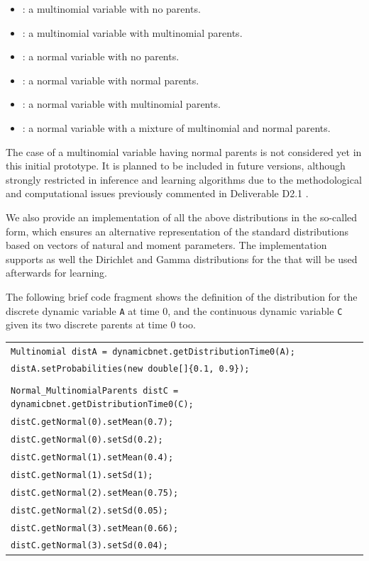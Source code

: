 \begin{itemize}
  \item {}: a multinomial variable with no parents.
  \item {}: a multinomial variable with multinomial parents.
  \item {}: a normal variable with no parents.
  \item {}: a normal variable with normal parents.
  \item {}: a normal variable with multinomial parents.
  \item {}: a normal variable with a mixture of multinomial and normal parents.
\end{itemize}

The case of a multinomial variable having normal parents is not considered yet in this initial prototype. It is planned to be included in future versions, although strongly restricted in inference and learning algorithms due to the methodological and computational issues previously commented in Deliverable D2.1 \cite{Deliverable2.1}. 

We also provide an implementation of all the above distributions in the so-called  form, which ensures an alternative representation of the standard distributions based on vectors of natural and moment parameters. The implementation supports as well the Dirichlet and Gamma distributions for the  that will be used afterwards for learning.

The following brief code fragment shows the definition of the distribution for the discrete dynamic variable \texttt{A} at time $0$, and the continuous dynamic variable \texttt{C} given its two discrete parents at time $0$ too.

\begin{table}[H]
\begin{tabular}{l} \hline         
        \texttt{Multinomial distA = dynamicbnet.getDistributionTime0(A);}\\
        \texttt{distA.setProbabilities(new double[]\{0.1, 0.9\});}\\\\

        \texttt{Normal\_MultinomialParents distC = dynamicbnet.getDistributionTime0(C);}\\
        \texttt{distC.getNormal(0).setMean(0.7);}\\
        \texttt{distC.getNormal(0).setSd(0.2);}\\
        \texttt{distC.getNormal(1).setMean(0.4);}\\
        \texttt{distC.getNormal(1).setSd(1);}\\
        \texttt{distC.getNormal(2).setMean(0.75);}\\
        \texttt{distC.getNormal(2).setSd(0.05);}\\
        \texttt{distC.getNormal(3).setMean(0.66);}\\
        \texttt{distC.getNormal(3).setSd(0.04);}\\ \hline
\end{tabular}
\end{table}
